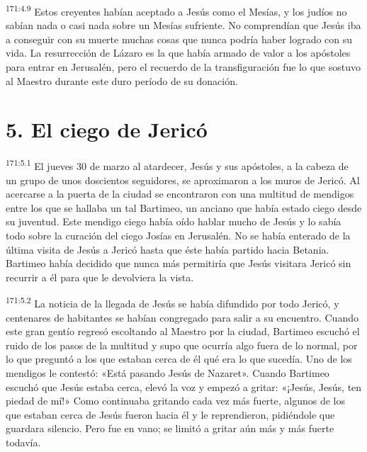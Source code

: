 \par 
\textsuperscript{171:4.9} Estos creyentes habían aceptado a Jesús como el Mesías, y los judíos no sabían nada o casi nada sobre un Mesías sufriente. No comprendían que Jesús iba a conseguir con su muerte muchas cosas que nunca podría haber logrado con su vida. La resurrección de Lázaro es la que había armado de valor a los apóstoles para entrar en Jerusalén, pero el recuerdo de la transfiguración fue lo que sostuvo al Maestro durante este duro período de su donación.

\section*{5. El ciego de Jericó}
\par 
\textsuperscript{171:5.1} El jueves 30 de marzo al atardecer, Jesús y sus apóstoles, a la cabeza de un grupo de unos doscientos seguidores, se aproximaron a los muros de Jericó. Al acercarse a la puerta de la ciudad se encontraron con una multitud de mendigos entre los que se hallaba un tal Bartimeo, un anciano que había estado ciego desde su juventud. Este mendigo ciego había oído hablar mucho de Jesús y lo sabía todo sobre la curación del ciego Josías en Jerusalén. No se había enterado de la última visita de Jesús a Jericó hasta que éste había partido hacia Betania. Bartimeo había decidido que nunca más permitiría que Jesús visitara Jericó sin recurrir a él para que le devolviera la vista.

\par 
\textsuperscript{171:5.2} La noticia de la llegada de Jesús se había difundido por todo Jericó, y centenares de habitantes se habían congregado para salir a su encuentro. Cuando este gran gentío regresó escoltando al Maestro por la ciudad, Bartimeo escuchó el ruido de los pasos de la multitud y supo que ocurría algo fuera de lo normal, por lo que preguntó a los que estaban cerca de él qué era lo que sucedía. Uno de los mendigos le contestó: «Está pasando Jesús de Nazaret». Cuando Bartimeo escuchó que Jesús estaba cerca, elevó la voz y empezó a gritar: «¡Jesús, Jesús, ten piedad de mí!» Como continuaba gritando cada vez más fuerte, algunos de los que estaban cerca de Jesús fueron hacia él y le reprendieron, pidiéndole que guardara silencio. Pero fue en vano; se limitó a gritar aún más y más fuerte todavía.

